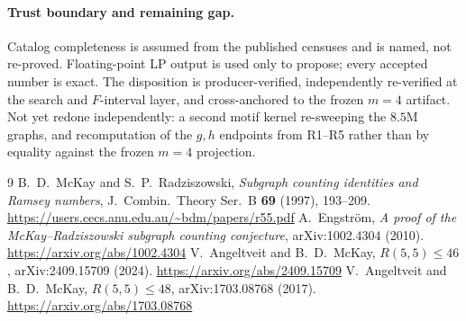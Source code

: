 \documentclass[11pt]{article}
\theoremstyle{definition}
\begin{document}
\paragraph{Trust boundary and remaining gap.} Catalog completeness is assumed
from the published censuses and is named, not re-proved. Floating-point LP output
is used only to propose; every accepted number is exact. The disposition is
producer-verified, independently re-verified at the search and $F$-interval
layer, and cross-anchored to the frozen $m=4$ artifact. Not yet redone
independently: a second motif kernel re-sweeping the $8.5$M graphs, and
recomputation of the $g,h$ endpoints from R1--R5 rather than by equality against
the frozen $m=4$ projection.

\begin{thebibliography}{9}
 B.~D.~McKay and S.~P.~Radziszowski,
\emph{Subgraph counting identities and Ramsey numbers},
J.~Combin.\ Theory Ser.~B \textbf{69} (1997), 193--209.
\url{https://users.cecs.anu.edu.au/~bdm/papers/r55.pdf}
 A.~Engstr\"om,
\emph{A proof of the McKay--Radziszowski subgraph counting conjecture},
arXiv:1002.4304 (2010). \url{https://arxiv.org/abs/1002.4304}
 V.~Angeltveit and B.~D.~McKay,
\emph{$R(5,5)\le46$}, arXiv:2409.15709 (2024).
\url{https://arxiv.org/abs/2409.15709}
 V.~Angeltveit and B.~D.~McKay,
\emph{$R(5,5)\le48$}, arXiv:1703.08768 (2017).
\url{https://arxiv.org/abs/1703.08768}
\end{thebibliography}
\end{document}

